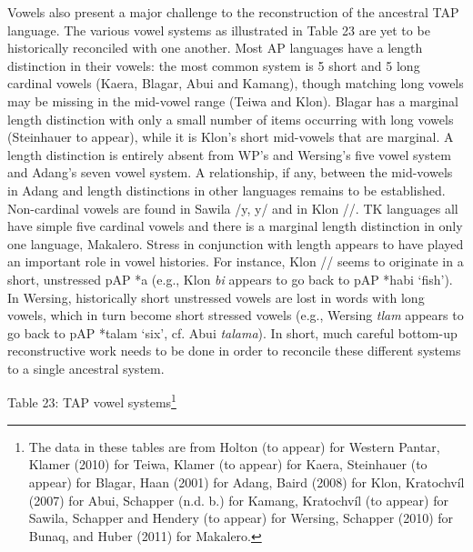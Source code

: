 Vowels also present a major challenge to the reconstruction of the ancestral TAP language. The various vowel systems as illustrated in Table 23 are yet to be historically reconciled with one another. Most AP languages have a length distinction in their vowels: the most common system is 5 short and 5 long cardinal vowels (Kaera, Blagar, Abui and Kamang), though matching long vowels may be missing in the mid-vowel range (Teiwa and Klon). Blagar has a marginal length distinction with only a small number of items occurring with long vowels (Steinhauer to appear), while it is Klon{\textquoteright}s short mid-vowels that are marginal. A length distinction is entirely absent from WP{\textquoteright}s and Wersing{\textquoteright}s five vowel system and Adang{\textquoteright}s seven vowel system. A relationship, if any, between the mid-vowels in Adang and length distinctions in other languages remains to be established. Non-cardinal vowels are found in Sawila /y, y{\textlengthmark}/ and in Klon /{\textschwa}/. TK 
languages all have simple five cardinal vowels and there is a marginal length distinction in only one language, Makalero. Stress in conjunction with length appears to have played an important role in vowel histories. For instance, Klon /{\textschwa}/ seems to originate in a short, unstressed pAP *a (e.g., Klon \textit{{\textschwa}bi} appears to go back to pAP *ha{\textprimstress}bi {\textquoteleft}fish{\textquoteright}). In Wersing, historically short unstressed vowels are lost in words with long vowels, which in turn become short stressed vowels (e.g., Wersing \textit{tlam} appears to go back to pAP *tala{\textlengthmark}m {\textquoteleft}six{\textquoteright}, cf. Abui \textit{tala{\textlengthmark}ma}). In short, much careful bottom-up reconstructive work needs to be done in order to reconcile these different systems to a single ancestral system.

{\centering
Table 23: TAP vowel systems\footnote{ The data in these tables are from Holton (to appear) for Western Pantar, Klamer (2010) for Teiwa, Klamer (to appear) for Kaera, Steinhauer (to appear) for Blagar, Haan (2001) for Adang, Baird (2008) for Klon, Kratochv\'il (2007) for Abui, Schapper (n.d. b.) for Kamang, Kratochv\'il (to appear) for Sawila, Schapper and Hendery (to appear) for Wersing, Schapper (2010) for Bunaq, and Huber (2011) for Makalero.}
\par}

